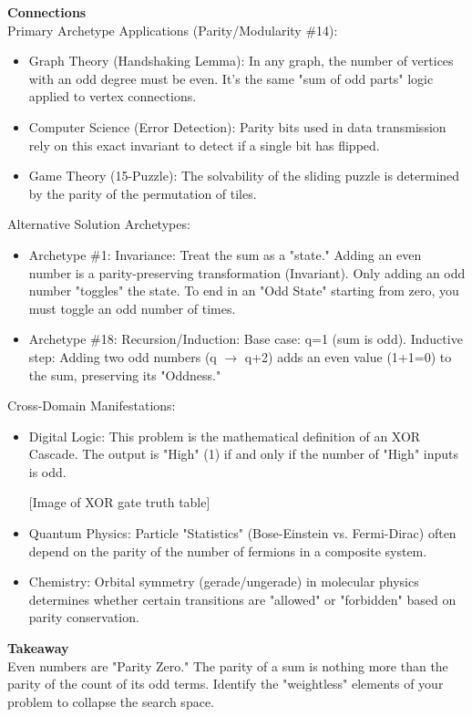 \documentclass{article}
\begin{document}
\noindent \textbf{Connections} \\
Primary Archetype Applications (Parity/Modularity \#14):
\begin{itemize}
    \item Graph Theory (Handshaking Lemma): In any graph, the number of vertices with an odd degree must be even. It’s the same "sum of odd parts" logic applied to vertex connections. 
    \item Computer Science (Error Detection): Parity bits used in data transmission rely on this exact invariant to detect if a single bit has flipped.
    \item Game Theory (15-Puzzle): The solvability of the sliding puzzle is determined by the parity of the permutation of tiles.
\end{itemize}
Alternative Solution Archetypes:
\begin{itemize}
    \item Archetype \#1: Invariance: Treat the sum as a "state." Adding an even number is a parity-preserving transformation (Invariant). Only adding an odd number "toggles" the state. To end in an "Odd State" starting from zero, you must toggle an odd number of times.
    \item Archetype \#18: Recursion/Induction: Base case: q=1 (sum is odd). Inductive step: Adding two odd numbers (q $\to$ q+2) adds an even value (1+1=0) to the sum, preserving its "Oddness."
\end{itemize}
Cross-Domain Manifestations:
\begin{itemize}
    \item Digital Logic: This problem is the mathematical definition of an XOR Cascade. The output is "High" (1) if and only if the number of "High" inputs is odd. 

[Image of XOR gate truth table]

    \item Quantum Physics: Particle "Statistics" (Bose-Einstein vs. Fermi-Dirac) often depend on the parity of the number of fermions in a composite system.
    \item Chemistry: Orbital symmetry (gerade/ungerade) in molecular physics determines whether certain transitions are "allowed" or "forbidden" based on parity conservation.
\end{itemize}

\noindent \textbf{Takeaway} \\
Even numbers are "Parity Zero." The parity of a sum is nothing more than the parity of the count of its odd terms. Identify the "weightless" elements of your problem to collapse the search space.
\end{document}
